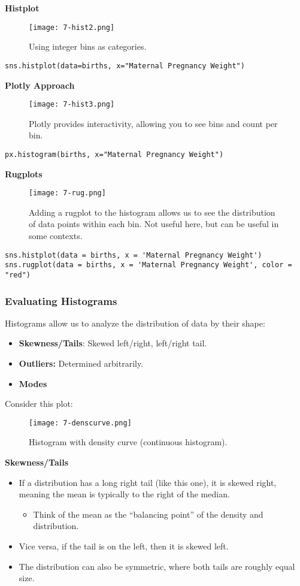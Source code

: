 \textbf{Histplot}
\begin{figure}[ht]
\texttt{[image: 7-hist2.png]}\centering\caption{Using integer bins as categories.}
\end{figure}
\begin{verbatim}
sns.histplot(data=births, x="Maternal Pregnancy Weight")
\end{verbatim}

\textbf{Plotly Approach}
\begin{figure}[ht]
    \texttt{[image: 7-hist3.png]}\centering\caption{Plotly provides interactivity, allowing you to see bins and count per bin.}
\end{figure}
\begin{verbatim}
px.histogram(births, x="Maternal Pregnancy Weight")
\end{verbatim}

\textbf{Rugplots}
\begin{figure}[ht]
\texttt{[image: 7-rug.png]}\centering\caption{Adding a rugplot to the histogram allows us to see the distribution of data points within each bin. Not useful here, but can be useful in some contexts.}
\end{figure}
\begin{verbatim}
sns.histplot(data = births, x = 'Maternal Pregnancy Weight')
sns.rugplot(data = births, x = 'Maternal Pregnancy Weight', color = "red")
\end{verbatim}

\subsubsection{Evaluating Histograms}
Histograms allow us to analyze the distribution of data by their shape:
\begin{itemize}
\item \textbf{Skewness/Tails}: Skewed left/right, left/right tail.
\item \textbf{Outliers:} Determined arbitrarily.
\item \textbf{Modes}
\end{itemize}

Consider this plot:
\begin{figure}[ht]
\texttt{[image: 7-denscurve.png]}\centering\caption{Histogram with density curve (continuous histogram).}
\end{figure}

\textbf{Skewness/Tails}
\begin{itemize}
\item If a distribution has a long right tail (like this one), it is skewed right, meaning the mean is typically to the right of the median.
\begin{itemize}
\item Think of the mean as the ``balancing point'' of the density and distribution.
\end{itemize}
\item Vice versa, if the tail is on the left, then it is skewed left.
\item The distribution can also be symmetric, where both tails are roughly equal size.
\end{itemize}

